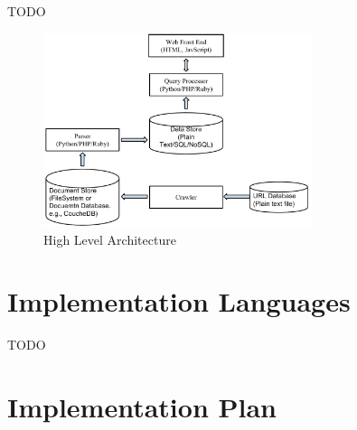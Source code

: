 \documentclass[letterpaper]{article}
\begin{document}
TODO

\begin{figure}[!h]
  \centering
  \includegraphics[width=0.7\textwidth]{img/high-level-arch}
  \caption{High Level Architecture}
  \label{fig:sysarch}
\end{figure}

\section{Implementation Languages}
\label{sec:implang}

TODO

\section{Implementation Plan}
\end{document}
